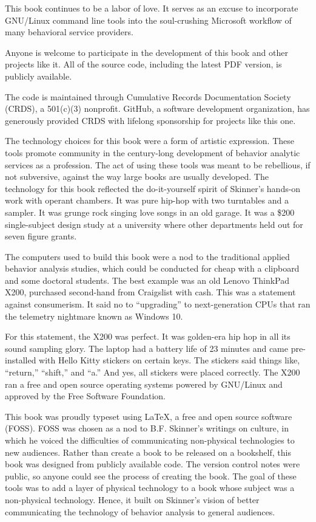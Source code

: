 This book continues to be a labor of love. It serves as an excuse to incorporate GNU/Linux command line tools into the soul-crushing Microsoft\textregistered{} workflow of many behavioral service providers. 

Anyone is welcome to participate in the development of this book and other projects like it. All of the source code, including the latest PDF version, is publicly available. 

The code is maintained through Cumulative Records Documentation Society (CRDS), a 501(c)(3) nonprofit. GitHub, a software development organization, has generously provided CRDS with lifelong sponsorship for projects like this one.

The technology choices for this book were a form of artistic expression. These tools promote community in the century-long development of behavior analytic services as a profession. The act of using these tools was meant to be rebellious, if not subversive, against the way large books are usually developed. The technology  for this book reflected the do-it-yourself spirit of Skinner's hands-on work with operant chambers. It was pure hip-hop with two turntables and a sampler. It was grunge rock singing love songs in an old garage. It was a \$200 single-subject design study at a university where other departments held out for seven figure grants.

The computers used to build this book were a nod to the traditional applied behavior analysis studies, which could be conducted for cheap with a clipboard and some doctoral students. The best example was an old Lenovo ThinkPad X200, purchased second-hand from Craigslist with cash. This was a statement against consumerism. It said no to ``upgrading'' to next-generation CPUs that ran the telemetry nightmare known as Windows 10.

For this statement, the X200 was perfect. It was golden-era hip hop in all its sound sampling glory. The laptop had a battery life of 23 minutes and came pre-installed with Hello Kitty stickers on certain keys. The stickers said things like, ``return,'' ``shift,'' and ``a.'' And yes, all stickers were placed correctly. The X200 ran a free and open source operating systems powered by GNU/Linux and approved by the Free Software Foundation.

This book was proudly typeset using \LaTeX{}, a free and open source software (FOSS). FOSS was chosen as a nod to B.F. Skinner's writings on culture, in which he voiced the difficulties of communicating non-physical technologies to new audiences. Rather than create a book to be released on a bookshelf, this book was designed from publicly available code. The version control notes were public, so anyone could see the process of creating the book. The goal of these tools was to add a layer of physical technology to a book whose subject was a non-physical technology. Hence, it built on Skinner's vision of better communicating the technology of behavior analysis to general audiences.

